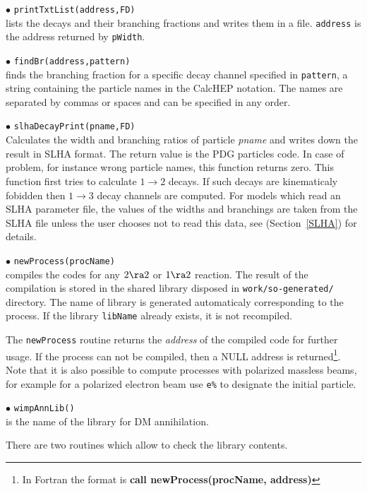 \documentclass[12pt,a4paper]{article}
\begin{document}
\noindent
$\bullet$ \verb|printTxtList(address,FD)|\\
lists the decays and their branching fractions and writes them in a file.
{\tt address} is the address returned by {\tt pWidth}.  

\noindent
$\bullet$ \verb|findBr(address,pattern)|\\ 
finds the branching fraction for a specific decay channel specified in
{\tt pattern},  a string containing the particle names 
in the CalcHEP notation. The names are separated by commas or spaces and can be specified in any
order. 

\noindent
$\bullet$ \verb|slhaDecayPrint(pname,FD)|\\
Calculates the width and branching ratios of particle {\it pname} and writes down the result
in SLHA format. The return value is the PDG particles code. In case of problem, for
instance wrong particle names, this function returns zero. This function
first tries to calculate $1\to2$  decays. If such decays are kinematicaly
fobidden then $1\to3$ decay channels are computed. 
For models which read an SLHA parameter file, the values of the widths and branchings are taken from the SLHA
file unless the user chooses not to read this data, see (Section~\ref{SLHA}) for details.
  

\noindent
$\bullet$ \verb|newProcess(procName)|\\
compiles the  codes for any $2\ra 2$ or  $1\ra 2$  reaction.
The result of the compilation is stored in the  shared library disposed in 
\verb|work/so-generated/| directory. The name of library is generated
automaticaly corresponding to the process.
 If the library {\tt libName} already exists, it is not recompiled.

The \verb|newProcess| routine returns the
{\it address} of the compiled code for further usage.   If the
process can not be compiled, then a NULL address is
returned\footnote{ In Fortran the  format is
{\bf call  newProcess(procName, address)}  }.
Note that it is also possible to compute processes with polarized massless beams, 
for example for a polarized electron beam use \verb|e%| to designate the initial
particle.




\noindent
$\bullet$ \verb|wimpAnnLib()|\\
is the name of the library for DM annihilation.

There are two routines which allow to check the library contents.\\
\end{document}
